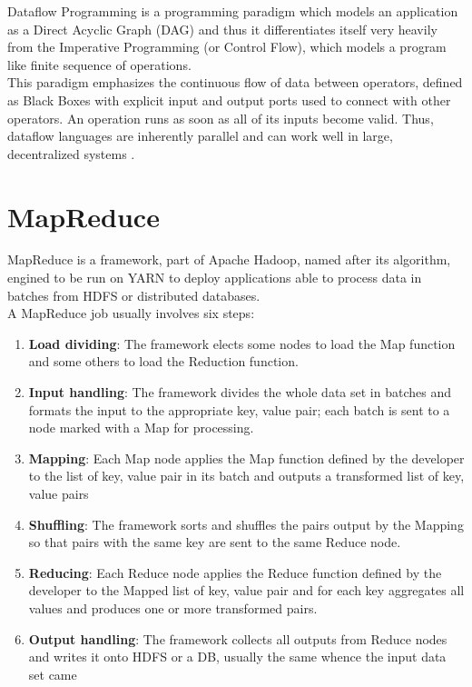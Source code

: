 Dataflow Programming is a programming paradigm which models an application as a Direct Acyclic Graph (DAG) and thus it differentiates itself very heavily from the Imperative Programming (or Control Flow), which models a program like finite sequence of operations.\\
This paradigm emphasizes the continuous flow of data between operators, defined as Black Boxes with explicit input and output ports used to connect with other operators. An operation runs as soon as all of its inputs become valid. Thus, dataflow languages are inherently parallel and can work well in large, decentralized systems \cite{Johnston:2004:ADP:1013208.1013209}.

\pagebreak

\section{MapReduce} \label{MapReduce}

MapReduce is a framework, part of Apache Hadoop, named after its algorithm, engined to be run on YARN to deploy applications able to process data in batches from HDFS or distributed databases. \\

A MapReduce job usually involves six steps:

\begin{enumerate}
	\item \textbf{Load dividing}: The framework elects some nodes to load the Map function and some others to load the Reduction function.
	\item \textbf{Input handling}: The framework divides the whole data set in batches and formats the input to the appropriate key, value pair; each batch is sent to a node marked with a Map for processing.
	\item \textbf{Mapping}: Each Map node applies the Map function defined by the developer to the list of key, value pair in its batch and outputs a transformed list of key, value pairs
	\item \textbf{Shuffling}: The framework sorts and shuffles the pairs output by the Mapping so that pairs with the same key are sent to the same Reduce node.
	\item \textbf{Reducing}: Each Reduce node applies the Reduce function defined by the developer to the Mapped list of key, value pair and for each key aggregates all values and produces one or more transformed pairs.
	\item \textbf{Output handling}: The framework collects all outputs from Reduce nodes and writes it onto HDFS or a DB, usually the same whence the input data set came
\end{enumerate}

